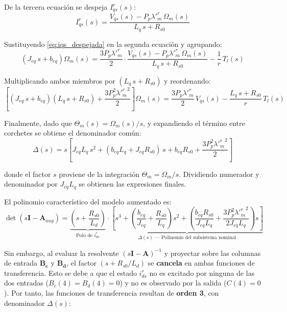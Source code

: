 \documentclass[12pt, a4paper,journal, onecolumn, compsoc]{IEEEtran}
\begin{document}
De la tercera ecuación se despeja $I_{qs}^r(s)$:
\begin{equation}\label{eq:iqs_despejada}
    I_{qs}^r(s) = \frac{V_{qs}(s) - P_p \lambda'^r_m\,\Omega_m(s)}{L_q\,s + R_{s0}}
\end{equation}

Sustituyendo \eqref{eq:iqs_despejada} en la segunda ecuación y agrupando:
\begin{equation}
    \left(J_{eq}\,s + b_{eq}\right)\Omega_m(s) = \frac{3 P_p \lambda'^r_m}{2} \cdot \frac{V_{qs}(s) - P_p \lambda'^r_m\,\Omega_m(s)}{L_q\,s + R_{s0}} - \frac{1}{r}\,T_l(s)
\end{equation}

Multiplicando ambos miembros por $(L_q\,s + R_{s0})$ y reordenando:
\begin{equation}
    \left[(J_{eq}\,s + b_{eq})(L_q\,s + R_{s0}) + \frac{3 P_p^2 {\lambda'^r_m}^2}{2}\right]\Omega_m(s) = \frac{3 P_p \lambda'^r_m}{2}\,V_{qs}(s) - \frac{L_q\,s + R_{s0}}{r}\,T_l(s)
\end{equation}

Finalmente, dado que $\Theta_m(s) = \Omega_m(s)/s$, y expandiendo el término entre corchetes se obtiene el denominador común:
\begin{equation}
    \Delta(s) = s\left[J_{eq} L_q\,s^2 + (b_{eq} L_q + J_{eq} R_{s0})\,s + b_{eq} R_{s0} + \frac{3 P_p^2 {\lambda'^r_m}^2}{2}\right]
\end{equation}

donde el factor $s$ proviene de la integración $\Theta_m = \Omega_m / s$. Dividiendo numerador y denominador por $J_{eq} L_q$ se obtienen las expresiones finales.

\vspace{0.3cm}

El polinomio característico del modelo aumentado es:
\begin{equation}
    \det(s\bm{I} - \bm{A}_{aug}) = \underbrace{\left(s + \frac{R_{s0}}{L_d}\right)}_{\text{Polo de } i_{ds}^r} \cdot \underbrace{\left[ s^3 + \left(\frac{b_{eq}}{J_{eq}} + \frac{R_{s0}}{L_q}\right)s^2 + \left(\frac{b_{eq} R_{s0}}{J_{eq} L_q} + \frac{3 P_p^2 {\lambda'^r_m}^2}{2 J_{eq} L_q}\right)s \right]}_{\Delta(s) \text{ --- Polinomio del subsistema nominal}}
\end{equation}

Sin embargo, al evaluar la resolvente $(s\bm{I}-\bm{A})^{-1}$ y proyectar sobre las columnas de entrada $\bm{B_c}$ y $\bm{B_d}$, el factor $(s + R_{s0}/L_d)$ se \textbf{cancela} en ambas funciones de transferencia. Esto se debe a que el estado $i_{ds}^r$ no es excitado por ninguna de las dos entradas ($B_c(4) = B_d(4) = 0$) y no es observado por la salida ($C(4) = 0$). Por tanto, las funciones de transferencia resultan de \textbf{orden 3}, con denominador $\Delta(s)$:
\end{document}
